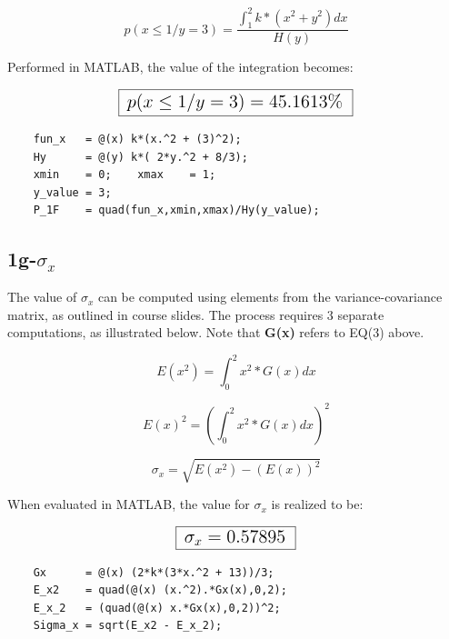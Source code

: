 \documentclass[]{article}
\begin{document}
\begin{displaymath}
	p(x \le 1/ y=3)  = \frac{   \int_1^2{k*(x^2+y^2) dx}  }{  H(y) } 
\end{displaymath}   

\noindent Performed in MATLAB, the value of the integration becomes:

\begin{displaymath}
	\fbox {   \Large $p(x \le 1/ y=3 ) = 45.1613\%$  }
\end{displaymath}  


\begin{lstlisting}
	fun_x   = @(x) k*(x.^2 + (3)^2);
	Hy      = @(y) k*( 2*y.^2 + 8/3);
	xmin    = 0;    xmax    = 1;
	y_value = 3;
	P_1F    = quad(fun_x,xmin,xmax)/Hy(y_value);
\end{lstlisting}





\subsection*{  1g-$\sigma_x $  }

The value of $\sigma_x$ can be computed using elements from the variance-covariance matrix, as outlined in course slides. The process requires 3 separate computations, as illustrated below. Note that {\bf G(x)} refers to EQ(3) above.

\begin{equation}
	E(x^2)= \int_0^2{x^2*G(x) dx }
\end{equation} 

\begin{equation}
	E(x)^2= (\int_0^2{x^2*G(x) dx })^2
\end{equation} 

\begin{equation}
	\sigma_x= \sqrt{E(x^2) - (E(x))^2}
\end{equation} 


\noindent When evaluated in MATLAB, the value for $\sigma_x $ is realized to be:

\begin{displaymath}
	\fbox {   \Large $\sigma_x  = 0.57895$  }
\end{displaymath}  

\begin{lstlisting}
	Gx      = @(x) (2*k*(3*x.^2 + 13))/3;	
	E_x2    = quad(@(x) (x.^2).*Gx(x),0,2);
	E_x_2   = (quad(@(x) x.*Gx(x),0,2))^2;
	Sigma_x = sqrt(E_x2 - E_x_2);
\end{lstlisting}
\end{document}
